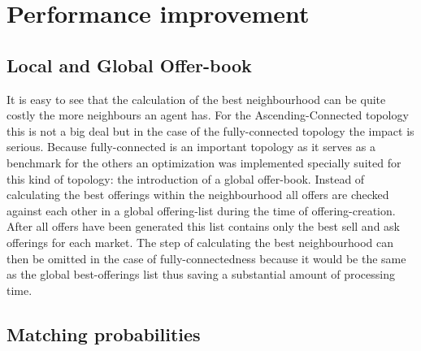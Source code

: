 \documentclass[Bachelorarbeit.tex]{subfiles}
\begin{document}
\section{Performance improvement}
\label{sec:implementation_performanceImprovement}

\subsection{Local and Global Offer-book}
It is easy to see that the calculation of the best neighbourhood can be quite costly the more neighbours an agent has. For the Ascending-Connected topology this is not a big deal but in the case of the fully-connected topology the impact is serious. Because fully-connected is an important topology as it serves as a benchmark for the others an optimization was implemented specially suited for this kind of topology: the introduction of a global offer-book. Instead of calculating the best offerings within the neighbourhood all offers are checked against each other in a global offering-list during the time of offering-creation. After all offers have been generated this list contains only the best sell and ask offerings for each market. The step of calculating the best neighbourhood can then be omitted in the case of fully-connectedness because it would be the same as the global best-offerings list thus saving a substantial amount of processing time.

\subsection{Matching probabilities}
\end{document}
